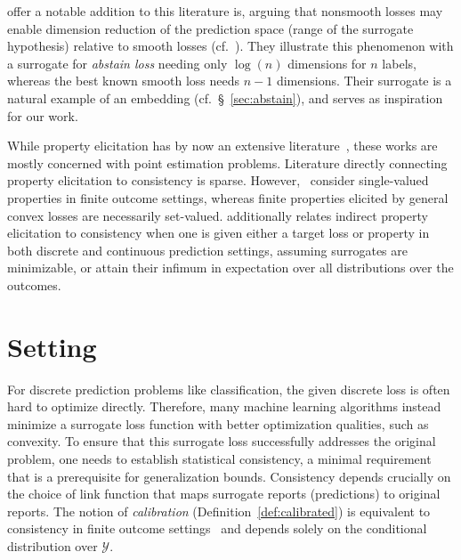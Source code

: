 \documentclass[11pt]{article}
\newcommand{\Y}{\mathcal{Y}}
\begin{document}
\citet{ramaswamy2018consistent} offer a notable addition to this literature is, arguing that nonsmooth losses may enable dimension reduction of the prediction space (range of the surrogate hypothesis) relative to smooth losses (cf.~\citep[Section 1.2]{ramaswamy2018consistent}).
They illustrate this phenomenon with a surrogate for \emph{abstain loss} needing only $\log(n)$ dimensions for $n$ labels, whereas the best known smooth loss needs $n-1$ dimensions.
Their surrogate is a natural example of an embedding (cf.~\S~\ref{sec:abstain}), and serves as inspiration for our work.


While property elicitation has by now an extensive literature~\citep{savage1971elicitation,osband1985information-eliciting,lambert2008eliciting,gneiting2011making,steinwart2014elicitation,frongillo2015vector-valued,fissler2016higher,lambert2018elicitation}, these works are mostly concerned with point estimation problems.
Literature directly connecting property elicitation to consistency is sparse.
However,~\citet{agarwal2015consistent} consider single-valued properties in finite outcome settings, whereas finite properties elicited by general convex losses are necessarily set-valued.
\citet{finocchiaro2021unifying} additionally relates indirect property elicitation to consistency when one is given either a target loss or property in both discrete and continuous prediction settings, assuming surrogates are minimizable, or attain their infimum in expectation over all distributions over the outcomes.



\section{Setting}
\label{sec:setting}

For discrete prediction problems like classification, the given discrete loss is often hard to optimize directly.
Therefore, many machine learning algorithms instead minimize a surrogate loss function with better optimization qualities, such as convexity.
To ensure that this surrogate loss successfully addresses the original problem, one needs to establish statistical consistency, a minimal requirement that is a prerequisite for generalization bounds.
Consistency depends crucially on the choice of link function that maps surrogate reports (predictions) to original reports.
The notion of \emph{calibration} (Definition~\ref{def:calibrated}) is equivalent to consistency in finite outcome settings~\citep{bartlett2006convexity,tewari2007consistency,ramaswamy2016convex} and depends solely on the conditional distribution over $\Y$.
\end{document}
